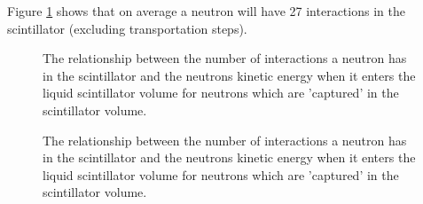 \par
Figure \ref{fig:dd_neutron_gdls_kinetic_energy_vs_number_of_interactions} shows that on average a neutron will have 27 interactions in the scintillator (excluding transportation steps).


\begin{figure}[!htbp]%
\centering
{}
\caption{The relationship between the number of interactions a neutron has in the scintillator and the neutrons kinetic energy when it enters the liquid scintillator volume for neutrons which are 'captured' in the scintillator volume.
}
\label{fig:dd_neutron_gdls_kinetic_energy_vs_number_of_interactions}
\end{figure}


\begin{figure}[!htbp]%
\centering
{}
\caption{The relationship between the number of interactions a neutron has in the scintillator and the neutrons kinetic energy when it enters the liquid scintillator volume for neutrons which are 'captured' in the scintillator volume.
}
\label{fig:dd_neutron_gdls_distance_vs_number_of_interactions}
\end{figure}



